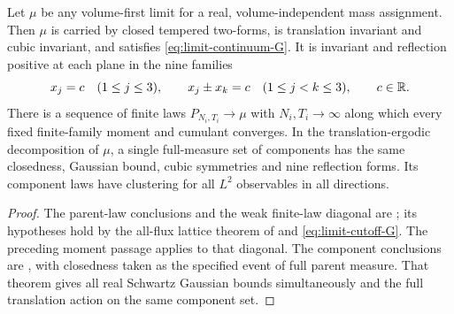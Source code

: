 \begin{proposition}\label{prop:limit-nine-mirrors}
Let $\mu$ be any volume-first limit for a real, volume-independent
mass assignment. Then $\mu$ is carried by closed tempered two-forms,
is translation invariant and cubic invariant, and satisfies
\eqref{eq:limit-continuum-G}. It is invariant and reflection
positive at each plane in the nine families
\[
 x_j=c\quad(1\le j\le3),\qquad
 x_j\pm x_k=c\quad(1\le j<k\le3),\qquad c\in\mathbb R.
\]
There is a sequence of finite laws $P_{N_i,T_i}\to\mu$ with
$N_i,T_i\to\infty$ along which every fixed finite-family moment
and cumulant converges. In the translation-ergodic decomposition
of $\mu$, a single full-measure set of components has the same
closedness, Gaussian bound, cubic symmetries and nine reflection
forms. Its component laws have clustering for all $L^2$ observables
in all directions.
\end{proposition}

\begin{proof}
The parent-law conclusions and the weak finite-law diagonal are
\cite[Corollary~7.4]{ContinuumLimits}; its hypotheses hold by
the all-flux lattice theorem of \cite[Theorem~A]{ChamberLattice}
and \eqref{eq:limit-cutoff-G}. The preceding moment passage
applies to that diagonal. The component conclusions are
\cite[Theorem~A]{ErgodicComponents}, with closedness taken as the
specified event of full parent measure. That theorem gives all
real Schwartz Gaussian bounds simultaneously and the full
translation action on the same component set.
\end{proof}


